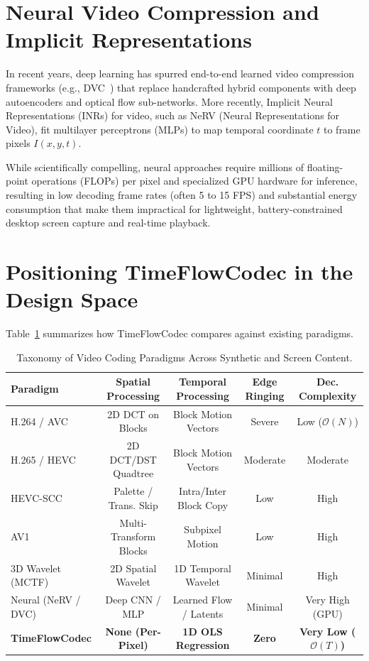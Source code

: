 \section{Neural Video Compression and Implicit Representations}
In recent years, deep learning has spurred end-to-end learned video compression frameworks (e.g., DVC~\cite{lu2019dvc}) that replace handcrafted hybrid components with deep autoencoders and optical flow sub-networks. More recently, Implicit Neural Representations (INRs) for video, such as NeRV (Neural Representations for Video), fit multilayer perceptrons (MLPs) to map temporal coordinate $t$ to frame pixels $I(x, y, t)$.

While scientifically compelling, neural approaches require millions of floating-point operations (FLOPs) per pixel and specialized GPU hardware for inference, resulting in low decoding frame rates (often 5 to 15 FPS) and substantial energy consumption that make them impractical for lightweight, battery-constrained desktop screen capture and real-time playback.

\section{Positioning TimeFlowCodec in the Design Space}
Table~\ref{tab:codec_comparison} summarizes how TimeFlowCodec compares against existing paradigms.

\begin{table}[h]
\centering
\small
\caption{Taxonomy of Video Coding Paradigms Across Synthetic and Screen Content.}
\label{tab:codec_comparison}
\begin{tabular}{lcccc}
\toprule
\textbf{Paradigm} & \textbf{Spatial Processing} & \textbf{Temporal Processing} & \textbf{Edge Ringing} & \textbf{Dec. Complexity} \\
\midrule
H.264 / AVC & 2D DCT on Blocks & Block Motion Vectors & Severe & Low ($\mathcal{O}(N)$) \\
H.265 / HEVC & 2D DCT/DST Quadtree & Block Motion Vectors & Moderate & Moderate \\
HEVC-SCC & Palette / Trans. Skip & Intra/Inter Block Copy & Low & High \\
AV1 & Multi-Transform Blocks & Subpixel Motion & Low & High \\
3D Wavelet (MCTF) & 2D Spatial Wavelet & 1D Temporal Wavelet & Minimal & High \\
Neural (NeRV / DVC) & Deep CNN / MLP & Learned Flow / Latents & Minimal & Very High (GPU) \\
\textbf{TimeFlowCodec} & \textbf{None (Per-Pixel)} & \textbf{1D OLS Regression} & \textbf{Zero} & \textbf{Very Low ($\mathcal{O}(T)$)} \\
\bottomrule
\end{tabular}
\end{table}


